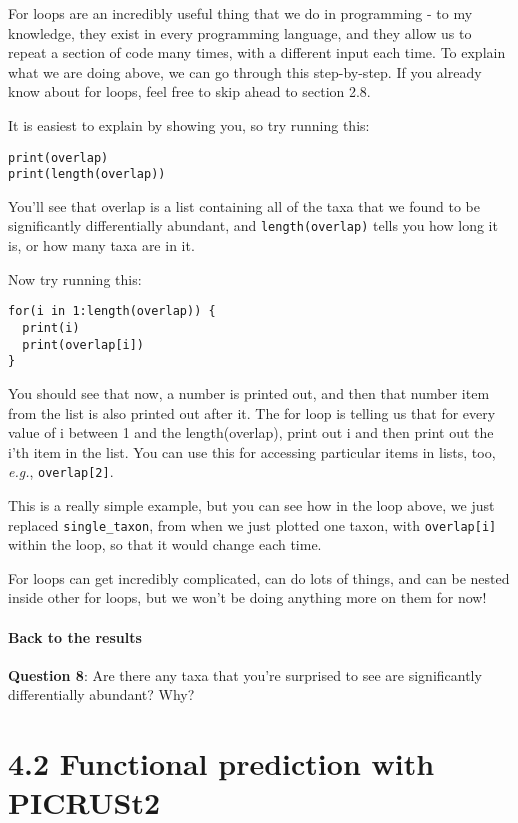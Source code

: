 \documentclass[
]{book}
\begin{document}
For loops are an incredibly useful thing that we do in programming - to my knowledge, they exist in every programming language, and they allow us to repeat a section of code many times, with a different input each time. To explain what we are doing above, we can go through this step-by-step. If you already know about for loops, feel free to skip ahead to section 2.8.

It is easiest to explain by showing you, so try running this:

\begin{verbatim}
print(overlap)
print(length(overlap))
\end{verbatim}

You'll see that overlap is a list containing all of the taxa that we found to be significantly differentially abundant, and \texttt{length(overlap)} tells you how long it is, or how many taxa are in it.

Now try running this:

\begin{verbatim}
for(i in 1:length(overlap)) {
  print(i)
  print(overlap[i])
}
\end{verbatim}

You should see that now, a number is printed out, and then that number item from the list is also printed out after it. The for loop is telling us that for every value of i between 1 and the length(overlap), print out i and then print out the i'th item in the list. You can use this for accessing particular items in lists, too, \emph{e.g.}, \texttt{overlap{[}2{]}}.

This is a really simple example, but you can see how in the loop above, we just replaced \texttt{single\_taxon}, from when we just plotted one taxon, with \texttt{overlap{[}i{]}} within the loop, so that it would change each time.

For loops can get incredibly complicated, can do lots of things, and can be nested inside other for loops, but we won't be doing anything more on them for now!

\paragraph{Back to the results}\label{back-to-the-results}

\textbf{Question 8}: Are there any taxa that you're surprised to see are significantly differentially abundant? Why?

\section{4.2 Functional prediction with PICRUSt2}\label{functional-prediction-with-picrust2-1}
\end{document}
